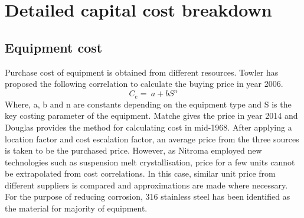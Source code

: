 \section{Detailed capital cost breakdown}
\subsection{Equipment cost}
Purchase cost of equipment is obtained from different resources. Towler \cite{sinnott_chemical_2020} has proposed the following correlation to calculate the buying price in year 2006.
\begin{equation}
    C_{e}=\ a+bS^n
\end{equation}
Where, a, b and n are constants depending on the equipment type and S is the key costing parameter of the equipment. Matche \cite{noauthor_matches_nodate} gives the price in year 2014 and Douglas \cite{douglas_conceptual_1988} provides the method for calculating cost in mid-1968. After applying a location factor and cost escalation factor, an average price from the three sources is taken to be the purchased price. However, as Nitroma employed new technologies such as suspension melt crystallisation, price for a few units cannot be extrapolated from cost correlations. In this case, similar unit price from different suppliers is compared and approximations are made where necessary. For the purpose of reducing corrosion, 316 stainless steel has been identified as the material for majority of equipment.

